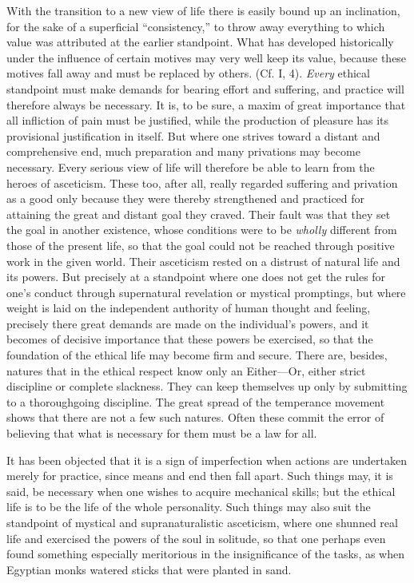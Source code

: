 \documentclass[12pt,a4paper,openany]{book}
\newcommand{\opage}[1]{\marginnote{\footnotesize\textit{[#1]}}}
\begin{document}
With the transition to a new view of life there is easily bound up an inclination, for the sake of a
superficial ``consistency,'' to throw away everything to which value was attributed at the earlier standpoint.
What has developed historically under the influence of certain motives may very well keep its value, because
these motives fall away and must be replaced by others. (Cf. I, 4). \textit{Every} ethical standpoint must make
demands for bearing effort and suffering, and practice will therefore always be necessary. It is, to be sure,
a maxim of great importance that all infliction of pain must be justified, while the production of pleasure
has its provisional justification in itself. But where one strives toward a distant and comprehensive end, much
preparation and many privations may become necessary. Every serious view of life will therefore be able to
learn from the heroes of asceticism. These too, after all, really regarded suffering and privation as a good
only because they were thereby strengthened and practiced for attaining the great and distant goal they
craved. Their fault was that they set the goal in another existence, whose conditions were to be \textit{wholly}
different from those of the present life, so that the goal could not be reached through positive work in the
given world. Their asceticism rested on a distrust of natural life and its powers. But precisely at a
standpoint where one does not get the rules for one's conduct through supernatural revelation or mystical
promptings, but where weight is laid on the independent authority of human thought and feeling, precisely there
great demands are made on the individual's powers, and it becomes of decisive importance that these powers be
exercised, so that the foundation of the ethical life may become firm and secure. There are, besides, natures
that in the ethical respect know only an Either---Or, either strict discipline or complete
\opage{191}slackness. They can keep themselves up only by submitting to a thoroughgoing discipline. The great
spread of the temperance movement shows that there are not a few such natures. Often these commit the error
of believing that what is necessary for them must be a law for all.

It has been objected that it is a sign of imperfection when actions are undertaken merely for practice, since
means and end then fall apart. Such things may, it is said, be necessary when one wishes to acquire mechanical
skills; but the ethical life is to be the life of the whole personality. Such things may also suit the
standpoint of mystical and supranaturalistic asceticism, where one shunned real life and exercised the powers
of the soul in solitude, so that one perhaps even found something especially meritorious in the
insignificance of the tasks, as when Egyptian monks watered sticks that were planted in sand.
\end{document}
